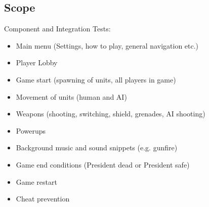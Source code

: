 \documentclass[12pt]{article}
\begin{document}
\subsection{Scope}
Component and Integration Tests:
\begin{itemize}
\item Main menu (Settings, how to play, general navigation etc.)
\item Player Lobby
\item Game start (spawning of units, all players in game)
\item Movement of units (human and AI)
\item Weapons (shooting, switching, shield, grenades, AI shooting)
\item Powerups
\item Background music and sound snippets (e.g. gunfire)
\item Game end conditions (President dead or President safe)
\item Game restart
\item Cheat prevention
\end{itemize}
\end{document}
